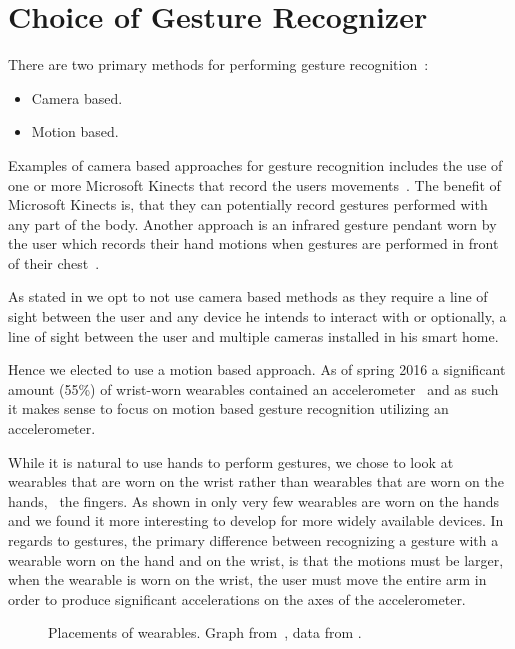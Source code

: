 \section{Choice of Gesture Recognizer}
\label{sec:analysis:choice-of-gesture-recognizer}

There are two primary methods for performing gesture recognition~\cite[pp. 19-21]{prespecialisation}:

\begin{itemize}
\item Camera based.
\item Motion based.
\end{itemize}

Examples of camera based approaches for gesture recognition includes the use of one or more Microsoft Kinects that record the users movements~\cite{caon2011context}. The benefit of Microsoft Kinects is, that they can potentially record gestures performed with any part of the body. Another approach is an infrared gesture pendant worn by the user which records their hand motions when gestures are performed in front of their chest~\cite{starner2000gesture}.

As stated in  we opt to not use camera based methods as they require a line of sight between the user and any device he intends to interact with or optionally, a line of sight between the user and multiple cameras installed in his smart home.

Hence we elected to use a motion based approach. As of spring 2016 a significant amount (55\%) of wrist-worn wearables contained an accelerometer~\cite[pp. 2-3]{prespecialisation} and as such it makes sense to focus on motion based gesture recognition utilizing an accelerometer.

While it is natural to use hands to perform gestures, we chose to look at wearables that are worn on the wrist rather than wearables that are worn on the hands, \eg~the fingers. As shown in  only very few wearables are worn on the hands and we found it more interesting to develop for more widely available devices. In regards to gestures, the primary difference between recognizing a gesture with a wearable worn on the hand and on the wrist, is that the motions must be larger, when the wearable is worn on the wrist, \ie the user must move the entire arm in order to produce significant accelerations on the axes of the accelerometer.

\begin{figure}[!htb]
  \centering
  
  \caption{Placements of wearables. Graph from~\cite[p. 2]{prespecialisation}, data from \protect\cite{LISTOFWEARABLES}.}
\label{fig:wearables-placement}
\end{figure}

